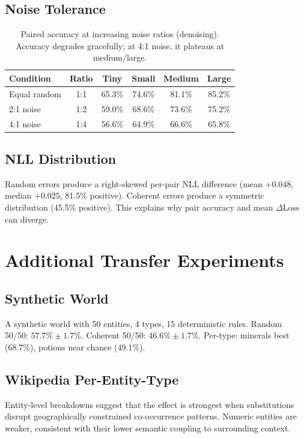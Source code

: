 \documentclass{article}
\begin{document}
\subsection{Noise Tolerance}

\begin{table}[h]
\centering
\small
\begin{tabular}{lccccc}
\toprule
Condition & Ratio & Tiny & Small & Medium & Large \\
\midrule
Equal random & 1:1 & 65.3\% & 74.6\% & 81.1\% & 85.2\% \\
2:1 noise    & 1:2 & 59.0\% & 68.6\% & 73.6\% & 75.2\% \\
4:1 noise    & 1:4 & 56.6\% & 64.9\% & 66.6\% & 65.8\% \\
\bottomrule
\end{tabular}
\caption{Paired accuracy at increasing noise ratios (denoising). Accuracy degrades gracefully; at 4:1 noise, it plateaus at medium/large.}
\label{tab:noise}
\end{table}

\subsection{NLL Distribution}

Random errors produce a right-skewed per-pair NLL difference (mean $+0.048$, median $+0.025$, 81.5\% positive). Coherent errors produce a symmetric distribution (45.5\% positive). This explains why pair accuracy and mean $\Delta\text{Loss}$ can diverge.

\section{Additional Transfer Experiments}
\label{app:transfer}

\subsection{Synthetic World}

A synthetic world with 50 entities, 4 types, 15 deterministic rules. Random 50/50: $57.7\% \pm 1.7\%$. Coherent 50/50: $46.6\% \pm 1.7\%$. Per-type: minerals best (68.7\%), potions near chance (49.1\%).

\subsection{Wikipedia Per-Entity-Type}

Entity-level breakdowns suggest that the effect is strongest when substitutions disrupt geographically constrained co-occurrence patterns. Numeric entities are weaker, consistent with their lower semantic coupling to surrounding context.
\end{document}
